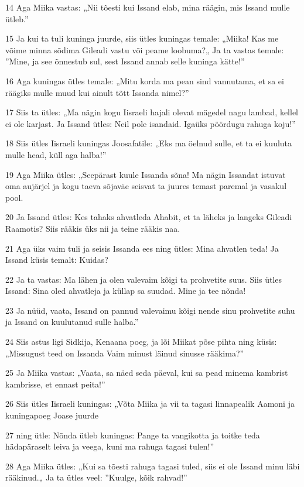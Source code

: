 \par 14 Aga Miika vastas: „Nii tõesti kui Issand elab, mina räägin, mis Issand mulle ütleb.”
\par 15 Ja kui ta tuli kuninga juurde, siis ütles kuningas temale: „Miika! Kas me võime minna sõdima Gileadi vastu või peame loobuma?„ Ja ta vastas temale: ”Mine, ja see õnnestub sul, sest Issand annab selle kuninga kätte!”
\par 16 Aga kuningas ütles temale: „Mitu korda ma pean sind vannutama, et sa ei räägiks mulle muud kui ainult tõtt Issanda nimel?”
\par 17 Siis ta ütles: „Ma nägin kogu Iisraeli hajali olevat mägedel nagu lambad, kellel ei ole karjast. Ja Issand ütles: Neil pole isandaid. Igaüks pöördugu rahuga koju!”
\par 18 Siis ütles Iisraeli kuningas Joosafatile: „Eks ma öelnud sulle, et ta ei kuuluta mulle head, küll aga halba!”
\par 19 Aga Miika ütles: „Seepärast kuule Issanda sõna! Ma nägin Issandat istuvat oma aujärjel ja kogu taeva sõjaväe seisvat ta juures temast paremal ja vasakul pool.
\par 20 Ja Issand ütles: Kes tahaks ahvatleda Ahabit, et ta läheks ja langeks Gileadi Raamotis? Siis rääkis üks nii ja teine rääkis naa.
\par 21 Aga üks vaim tuli ja seisis Issanda ees ning ütles: Mina ahvatlen teda! Ja Issand küsis temalt: Kuidas?
\par 22 Ja ta vastas: Ma lähen ja olen valevaim kõigi ta prohvetite suus. Siis ütles Issand: Sina oled ahvatleja ja küllap sa suudad. Mine ja tee nõnda!
\par 23 Ja nüüd, vaata, Issand on pannud valevaimu kõigi nende sinu prohvetite suhu ja Issand on kuulutanud sulle halba.”
\par 24 Siis astus ligi Sidkija, Kenaana poeg, ja lõi Miikat põse pihta ning küsis: „Missugust teed on Issanda Vaim minust läinud sinusse rääkima?”
\par 25 Ja Miika vastas: „Vaata, sa näed seda päeval, kui sa pead minema kambrist kambrisse, et ennast peita!”
\par 26 Siis ütles Iisraeli kuningas: „Võta Miika ja vii ta tagasi linnapealik Aamoni ja kuningapoeg Joase juurde
\par 27 ning ütle: Nõnda ütleb kuningas: Pange ta vangikotta ja toitke teda hädapäraselt leiva ja veega, kuni ma rahuga tagasi tulen!”
\par 28 Aga Miika ütles: „Kui sa tõesti rahuga tagasi tuled, siis ei ole Issand minu läbi rääkinud.„ Ja ta ütles veel: ”Kuulge, kõik rahvad!”
